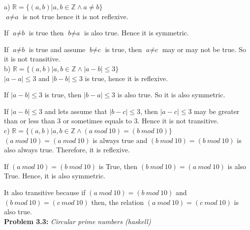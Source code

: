 \documentclass[a4paper,12pt]{article}
\begin{document}
    a) $\mathds{R} = \{(\textit{a},\textit{b}) | \textit{a}, \textit{b} \in \mathds{Z} \wedge \textit{a} \neq  \textit{b} \}$\\

    $\textit{a} \neq \textit{a}$ is not true hence it is not reflexive.

    If $\textit{a} \neq \textit{b}$ is true then $\textit{b} \neq \textit{a} $ is also true. Hence it is symmetric.

    If $ \textit{a} \neq \textit{b}$ is true and assume $ \textit{b} \neq \textit{c}$ is true, then $ \textit{a} \neq \textit{c}$ may or may not be true. So it is not transitive.\\

    b) $\mathds{R} = \{(\textit{a},\textit{b}) | \textit{a}, \textit{b} \in \mathds{Z} \wedge |\textit{a} - \textit{b} | \leq 3  \}$\\

    $ |\textit{a} - \textit{a} | \leq 3$ and $ |\textit{b} - \textit{b} | \leq 3$ is true, hence it is reflexive.

    If  $ |\textit{a} - \textit{b} | \leq 3$ is true, then  $ |\textit{b} - \textit{a} | \leq 3$ is also true. So it is also symmetric.

    If $ |\textit{a} - \textit{b} | \leq 3$ and lets assume that $ |\textit{b} - \textit{c} | \leq 3$, then $ |\textit{a} - \textit{c} | \leq 3$ may be greater than or less than 3 or sometimes equals to 3. Hence it is not transitive.\\

    c) $\mathds{R} = \{(\textit{a},\textit{b}) | \textit{a}, \textit{b} \in \mathds{Z} \wedge (\textit{a}\ mod\ 10) = (\textit{b}\ mod\ 10) \}$\\

    $(\textit{a}\ mod\ 10) = (\textit{a}\ mod\ 10)$ is always true and $(\textit{b}\ mod\ 10) = (\textit{b}\ mod\ 10)$ is also always true. Therefore, it is reflexive.

    If $(\textit{a}\ mod\ 10) = (\textit{b}\ mod\ 10)$ is True, then $(\textit{b}\ mod\ 10) = (\textit{a}\ mod\ 10)$ is also True. Hence, it is also symmetric.

    It also transitive because if $(\textit{a}\ mod\ 10) = (\textit{b}\ mod\ 10)$ and $(\textit{b}\ mod\ 10) = (\textit{c}\ mod\ 10)$ then, the relation $(\textit{a}\ mod\ 10) = (\textit{c}\ mod\ 10)$ is also true.\\


    \textbf{Problem 3.3:} \textit{Circular prime numbers (haskell)}
\end{document}
